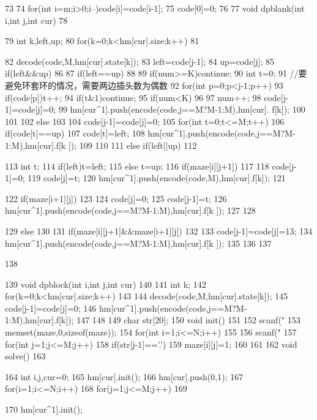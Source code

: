 \documentclass[11pt]{article}
\begin{document}
\begin{Code}
73    {
74        for(int i=m;i>0;i--)code[i]=code[i-1];
75        code[0]=0;
76    }
77    void dpblank(int i,int j,int cur)
78    {
79        int k,left,up;
80        for(k=0;k<hm[cur].size;k++)
81        {
82            decode(code,M,hm[cur].state[k]);
83            left=code[j-1];
84            up=code[j];
85            if(left&&up)
86            {
87                if(left==up)
88                {
89                    if(num>=K)continue;
90                    int t=0;
91                    //要避免环套环的情况，需要两边插头数为偶数
92                    for(int p=0;p<j-1;p++)
93                       if(code[p])t++;
94                    if(t&1)continue;
95                    if(num<K)
96                    {
97                         num++;
98                         code[j-1]=code[j]=0;
99                         hm[cur^1].push(encode(code,j==M?M-1:M),hm[cur].
                              f[k]);
100                   }
101               }
102               else
103               {
104                   code[j-1]=code[j]=0;
105                   for(int t=0;t<=M;t++)
106                      if(code[t]==up)
107                        code[t]=left;
108                   hm[cur^1].push(encode(code,j==M?M-1:M),hm[cur].f[k
                          ]);
109               }
110           }
111           else if(left||up)
112           {
113               int t;
114               if(left)t=left;
115               else t=up;
116               if(maze[i][j+1])
117               {
118                   code[j-1]=0;
119                   code[j]=t;
120                   hm[cur^1].push(encode(code,M),hm[cur].f[k]);
121               }


122                     if(maze[i+1][j])
123                     {
124                         code[j]=0;
125                         code[j-1]=t;
126                         hm[cur^1].push(encode(code,j==M?M-1:M),hm[cur].f[k
                               ]);
127                     }
128              }
129              else
130              {
131                     if(maze[i][j+1]&&maze[i+1][j])
132                     {
133                         code[j-1]=code[j]=13;
134                         hm[cur^1].push(encode(code,j==M?M-1:M),hm[cur].f[k
                               ]);
135                     }
136              }
137       }
138   }
139   void dpblock(int i,int j,int cur)
140   {
141       int k;
142       for(k=0;k<hm[cur].size;k++)
143       {
144           decode(code,M,hm[cur].state[k]);
145           code[j-1]=code[j]=0;
146           hm[cur^1].push(encode(code,j==M?M-1:M),hm[cur].f[k]);
147       }
148   }
149   char str[20];
150   void init()
151   {
152       scanf("%
153       memset(maze,0,sizeof(maze));
154       for(int i=1;i<=N;i++)
155       {
156           scanf("%
157           for(int j=1;j<=M;j++)
158              if(str[j-1]=='.')
159                maze[i][j]=1;
160       }
161   }
162   void solve()
163   {
164       int i,j,cur=0;
165       hm[cur].init();
166       hm[cur].push(0,1);
167       for(i=1;i<=N;i++)
168         for(j=1;j<=M;j++)
169         {
170              hm[cur^1].init();


}}
\end{Code}
\end{document}
